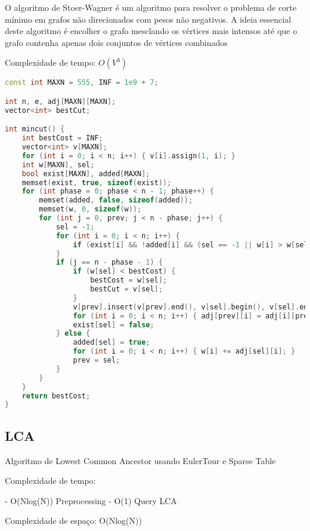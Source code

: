 \documentclass[11pt, a4paper, twoside]{article}
\begin{document}
O algoritmo de Stoer-Wagner é um algoritmo para resolver o problema de corte mínimo em grafos não direcionados com pesos não negativos. A ideia essencial deste algoritmo é encolher o grafo mesclando os vértices mais intensos até que o grafo contenha apenas dois conjuntos de vértices combinados

Complexidade de tempo: $O(V^3)$

\begin{lstlisting}[language=C++]
const int MAXN = 555, INF = 1e9 + 7;

int n, e, adj[MAXN][MAXN];
vector<int> bestCut;

int mincut() {
    int bestCost = INF;
    vector<int> v[MAXN];
    for (int i = 0; i < n; i++) { v[i].assign(1, i); }
    int w[MAXN], sel;
    bool exist[MAXN], added[MAXN];
    memset(exist, true, sizeof(exist));
    for (int phase = 0; phase < n - 1; phase++) {
        memset(added, false, sizeof(added));
        memset(w, 0, sizeof(w));
        for (int j = 0, prev; j < n - phase; j++) {
            sel = -1;
            for (int i = 0; i < n; i++) {
                if (exist[i] && !added[i] && (sel == -1 || w[i] > w[sel])) { sel = i; }
            }
            if (j == n - phase - 1) {
                if (w[sel] < bestCost) {
                    bestCost = w[sel];
                    bestCut = v[sel];
                }
                v[prev].insert(v[prev].end(), v[sel].begin(), v[sel].end());
                for (int i = 0; i < n; i++) { adj[prev][i] = adj[i][prev] += adj[sel][i]; }
                exist[sel] = false;
            } else {
                added[sel] = true;
                for (int i = 0; i < n; i++) { w[i] += adj[sel][i]; }
                prev = sel;
            }
        }
    }
    return bestCost;
}
\end{lstlisting}

\subsection{LCA}


Algoritmo de Lowest Common Ancestor usando EulerTour e Sparse Table

Complexidade de tempo:

- O(Nlog(N)) Preprocessing
- O(1) Query LCA

Complexidade de espaço: O(Nlog(N))
\end{document}
